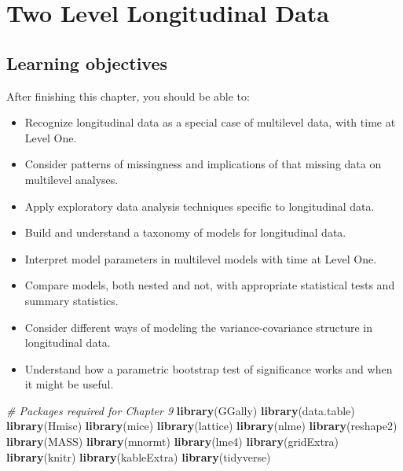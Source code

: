 \documentclass[
]{krantz}
\newenvironment{Shaded}{\begin{snugshade}}{\end{snugshade}}
\newcommand{\CommentTok}[1]{\textcolor[rgb]{0.37,0.37,0.37}{\textit{#1}}}
\newcommand{\KeywordTok}[1]{\textcolor[rgb]{0.27,0.27,0.27}{\textbf{#1}}}
\newcommand{\NormalTok}[1]{#1}
\providecommand{\tightlist}{%
  \setlength{\itemsep}{0pt}\setlength{\parskip}{0pt}}
\begin{document}
\hypertarget{ch-lon}{%
\chapter{Two Level Longitudinal Data}\label{ch-lon}}

\hypertarget{learning-objectives-1}{%
\section{Learning objectives}\label{learning-objectives-1}}

After finishing this chapter, you should be able to:

\begin{itemize}
\tightlist
\item
  Recognize longitudinal data as a special case of multilevel data, with time at Level One.
\item
  Consider patterns of missingness and implications of that missing data on multilevel analyses.
\item
  Apply exploratory data analysis techniques specific to longitudinal data.
\item
  Build and understand a taxonomy of models for longitudinal data.
\item
  Interpret model parameters in multilevel models with time at Level One.
\item
  Compare models, both nested and not, with appropriate statistical tests and summary statistics.
\item
  Consider different ways of modeling the variance-covariance structure in longitudinal data.
\item
  Understand how a parametric bootstrap test of significance works and when it might be useful.
\end{itemize}

\begin{Shaded}
\begin{Highlighting}[]
\CommentTok{# Packages required for Chapter 9}
\KeywordTok{library}\NormalTok{(GGally)}
\KeywordTok{library}\NormalTok{(data.table)}
\KeywordTok{library}\NormalTok{(Hmisc)}
\KeywordTok{library}\NormalTok{(mice)}
\KeywordTok{library}\NormalTok{(lattice)}
\KeywordTok{library}\NormalTok{(nlme)}
\KeywordTok{library}\NormalTok{(reshape2)}
\KeywordTok{library}\NormalTok{(MASS)}
\KeywordTok{library}\NormalTok{(mnormt)}
\KeywordTok{library}\NormalTok{(lme4)}
\KeywordTok{library}\NormalTok{(gridExtra) }
\KeywordTok{library}\NormalTok{(knitr)}
\KeywordTok{library}\NormalTok{(kableExtra)}
\KeywordTok{library}\NormalTok{(tidyverse)}
\end{Highlighting}
\end{Shaded}
\end{document}
